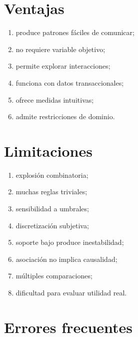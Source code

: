 \documentclass[
  spanish,
  10.5pt,
  letterpaper,
  DIV=11,
  numbers=noendperiod,
  oneside,
  open=any]{scrreprt}
\providecommand{\tightlist}{%
  \setlength{\itemsep}{0pt}\setlength{\parskip}{0pt}}
\theoremstyle{definition}
\theoremstyle{definition}
\theoremstyle{plain}
\theoremstyle{remark}
\begin{document}
\section*{Ventajas}\label{ventajas-7}


\begin{enumerate}
\def\labelenumi{\arabic{enumi}.}
\tightlist
\item
  produce patrones fáciles de comunicar;
\item
  no requiere variable objetivo;
\item
  permite explorar interacciones;
\item
  funciona con datos transaccionales;
\item
  ofrece medidas intuitivas;
\item
  admite restricciones de dominio.
\end{enumerate}

\section*{Limitaciones}\label{limitaciones-7}


\begin{enumerate}
\def\labelenumi{\arabic{enumi}.}
\tightlist
\item
  explosión combinatoria;
\item
  muchas reglas triviales;
\item
  sensibilidad a umbrales;
\item
  discretización subjetiva;
\item
  soporte bajo produce inestabilidad;
\item
  asociación no implica causalidad;
\item
  múltiples comparaciones;
\item
  dificultad para evaluar utilidad real.
\end{enumerate}

\section*{Errores frecuentes}\label{errores-frecuentes-18}

\end{document}

